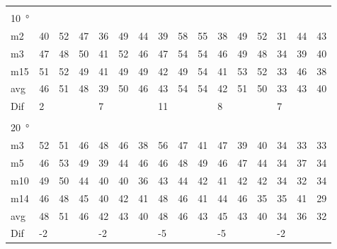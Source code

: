 \begin{table}[H]
\begin{tabular}{l|l|l|l|l|l|l|l|l|l|l|l|l|lll}
 \multicolumn{16}{l}{ } \\                             
\SI{10}{\degree}   & \multicolumn{3}{l|}{} & \multicolumn{3}{l|}{} & \multicolumn{3}{l|}{} & \multicolumn{3}{l|}{} & \multicolumn{3}{l}{}   \\  \hline
m2    &  40    &  52    &  47    &  36    &  49    &   44   &  39    &   58    &   55   &   38    &  49    &  52    & \multicolumn{1}{l|}{31} & \multicolumn{1}{l|}{44} & 43 \\
m3    &  47    &  48    &  50    &   41   &  52    &   46   &   47   &  54     &   54   &   46    & 49     &  48    & \multicolumn{1}{l|}{34} & \multicolumn{1}{l|}{39} & 40 \\
m15  &  51    &  52    &  49    &  41    & 49     &   49   &   42   &   49    &   54   &    41   &   53   &  52    & \multicolumn{1}{l|}{33} & \multicolumn{1}{l|}{46} &  38\\ \hline
avg &  46    & 51     & 48     & 39     &   50   & 46     &  43    &  54     &  54    &  42     & 51     & 50     & \multicolumn{1}{l|}{33} & \multicolumn{1}{l|}{43}  & 40 \\ \hline  
Dif & \multicolumn{3}{l|}{2} & \multicolumn{3}{l|}{7} & \multicolumn{3}{l|}{11} & \multicolumn{3}{l|}{8} & \multicolumn{3}{l}{7} \\     
\multicolumn{16}{l}{ } \\                
\SI{20}{\degree}   & \multicolumn{3}{l|}{} & \multicolumn{3}{l|}{} & \multicolumn{3}{l|}{} & \multicolumn{3}{l|}{} & \multicolumn{3}{l}{}   \\  \hline
m3    &  52    &  51    &  46    &  48    &  46    &  38    &   56   &    47   &  41    &  47     &  39    &  40    & \multicolumn{1}{l|}{34} & \multicolumn{1}{l|}{33} &33  \\
m5    &  46    &  53    &  49    &  39    &  44    & 46     &   46   &  48     &  49    &  46     &  47    &   44   & \multicolumn{1}{l|}{34} & \multicolumn{1}{l|}{37} &34  \\
m10  &  49    &  50    &  44    &  40    &   40   &   36   &   43   &   44    &   42   &  41     & 42     & 42     & \multicolumn{1}{l|}{34} & \multicolumn{1}{l|}{32} &34  \\
m14  &  46    &  48    &  45    &  40    &  42    &   41   &    48  &  46     &   41   &  44     &  46    &  35    & \multicolumn{1}{l|}{35} & \multicolumn{1}{l|}{41} & 29 \\ \hline
avg & 48     &  51    &  46    &   42   &  43    &  40    &  48    &   46    &  43    &  45     & 43     &  40    & \multicolumn{1}{l|}{34} & \multicolumn{1}{l|}{36}  & 32  \\ \hline  
Dif & \multicolumn{3}{l|}{-2} & \multicolumn{3}{l|}{-2} & \multicolumn{3}{l|}{-5} & \multicolumn{3}{l|}{-5} & \multicolumn{3}{l}{-2}    
\end{tabular}
\end{table}

